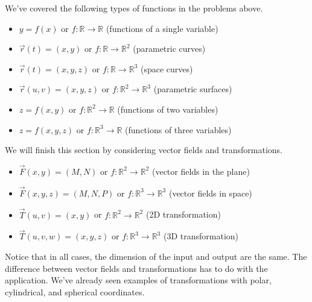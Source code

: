 We've covered the following types of functions in the problems above.
\begin{itemize}
 \item $y=f(x)$ or $f\colon \mathbb{R}\to\mathbb{R}$ (functions of a single variable)
 \item $\vec r(t)=(x,y)$ or $f\colon \mathbb{R}\to\mathbb{R}^2$ (parametric curves)
 \item $\vec r(t)=(x,y,z)$ or $f\colon \mathbb{R}\to\mathbb{R}^3$ (space curves)
 \item $\vec r(u,v)=(x,y,z)$ or $f\colon \mathbb{R}^2\to\mathbb{R}^3$ (parametric surfaces)
 \item $z=f(x,y)$ or $f\colon \mathbb{R}^2\to\mathbb{R}$ (functions of two variables)
 \item $z=f(x,y,z)$ or $f\colon \mathbb{R}^3\to\mathbb{R}$ (functions of three variables)
\end{itemize}
We will finish this section by considering vector fields and transformations. 
\begin{itemize}
 \item $\vec F(x,y)=(M,N)$ or $f\colon \mathbb{R}^2\to\mathbb{R}^2$ (vector fields in the plane)
 \item $\vec F(x,y,z)=(M,N,P)$ or $f\colon \mathbb{R}^3\to\mathbb{R}^3$ (vector fields in space)
 \item $\vec T(u,v)=(x,y)$ or $f\colon \mathbb{R}^2\to\mathbb{R}^2$ (2D transformation)
 \item $\vec T(u,v,w)=(x,y,z)$ or $f\colon \mathbb{R}^3\to\mathbb{R}^3$ (3D transformation)
\end{itemize}
Notice that in all cases, the dimension of the input and output are the same. The difference between vector fields and transformations has to do with the application. We've already seen examples of transformations with polar, cylindrical, and spherical coordinates.

